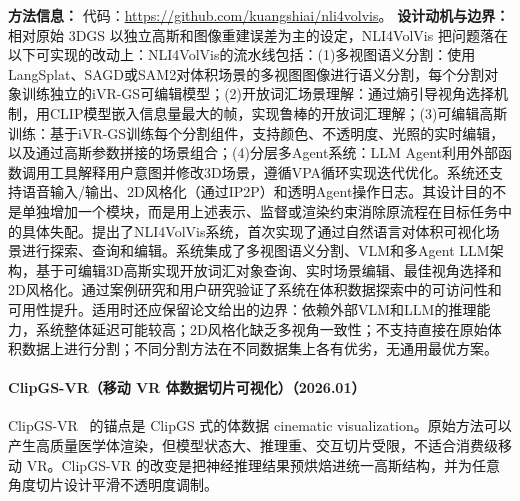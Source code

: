 \textbf{方法信息：} 代码：\url{https://github.com/kuangshiai/nli4volvis}。
\textbf{设计动机与边界：} 相对原始 3DGS 以独立高斯和图像重建误差为主的设定，NLI4VolVis 把问题落在以下可实现的改动上：NLI4VolVis的流水线包括：(1)多视图语义分割：使用LangSplat、SAGD或SAM2对体积场景的多视图图像进行语义分割，每个分割对象训练独立的iVR-GS可编辑模型；(2)开放词汇场景理解：通过熵引导视角选择机制，用CLIP模型嵌入信息量最大的帧，实现鲁棒的开放词汇理解；(3)可编辑高斯训练：基于iVR-GS训练每个分割组件，支持颜色、不透明度、光照的实时编辑，以及通过高斯参数拼接的场景组合；(4)分层多Agent系统：LLM Agent利用外部函数调用工具解释用户意图并修改3D场景，遵循VPA循环实现迭代优化。系统还支持语音输入/输出、2D风格化（通过IP2P）和透明Agent操作日志。其设计目的不是单独增加一个模块，而是用上述表示、监督或渲染约束消除原流程在目标任务中的具体失配。提出了NLI4VolVis系统，首次实现了通过自然语言对体积可视化场景进行探索、查询和编辑。系统集成了多视图语义分割、VLM和多Agent LLM架构，基于可编辑3D高斯实现开放词汇对象查询、实时场景编辑、最佳视角选择和2D风格化。通过案例研究和用户研究验证了系统在体积数据探索中的可访问性和可用性提升。适用时还应保留论文给出的边界：依赖外部VLM和LLM的推理能力，系统整体延迟可能较高；2D风格化缺乏多视角一致性；不支持直接在原始体积数据上进行分割；不同分割方法在不同数据集上各有优劣，无通用最优方案。
\paragraph{ClipGS-VR（移动 VR 体数据切片可视化）（2026.01）}
ClipGS-VR~\cite{2601_19310} 的锚点是 ClipGS 式的体数据 cinematic visualization。原始方法可以产生高质量医学体渲染，但模型状态大、推理重、交互切片受限，不适合消费级移动 VR。ClipGS-VR 的改变是把神经推理结果预烘焙进统一高斯结构，并为任意角度切片设计平滑不透明度调制。

